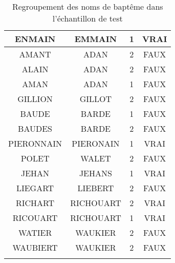 \begin{center}
\begin{longtable}{|c|c|c|c|}
\hline	ENMAIN	&	EMMAIN	&	1	&	VRAI	\\
\hline	AMANT	&	ADAN	&	2	&	FAUX	\\
\hline	ALAIN	&	ADAN	&	2	&	FAUX	\\
\hline	AMAN	&	ADAN	&	1	&	FAUX	\\
\hline	GILLION	&	GILLOT	&	2	&	FAUX	\\
\hline	BAUDE	&	BARDE	&	1	&	FAUX	\\
\hline	BAUDES	&	BARDE	&	2	&	FAUX	\\
\hline	PIERONNAIN	&	PIERONAIN	&	1	&	VRAI	\\
\hline	POLET	&	WALET	&	2	&	FAUX	\\
\hline	JEHAN	&	JEHANS	&	1	&	VRAI	\\
\hline	LIEGART	&	LIEBERT	&	2	&	FAUX	\\
\hline	RICHART	&	RICHOUART	&	2	&	VRAI	\\
\hline	RICOUART	&	RICHOUART	&	1	&	VRAI	\\
\hline	WATIER	&	WAUKIER	&	2	&	FAUX	\\
\hline	WAUBIERT	&	WAUKIER	&	2	&	FAUX	\\
\hline     
\caption{Regroupement des noms de baptême dans l'échantillon de test}
\label{test_prenom}
\end{longtable}

\end{center}
\normalsize